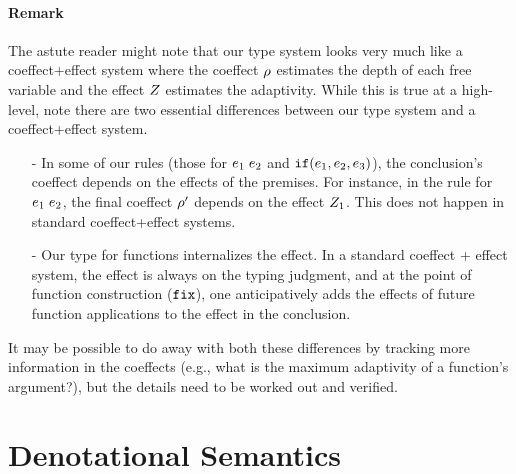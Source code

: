 \documentclass[a4paper,11pt]{article}
\theoremstyle{definition}
\begin{document}
\paragraph{Remark}
The astute reader might note that our type system looks very much like
a coeffect+effect system where the coeffect $\rho$ estimates the
depth of each free variable and the effect $Z$ estimates the
adaptivity. While this is true at a high-level, note there are two
essential differences between our type system and a coeffect+effect
system.
\begin{itemize}
\item[-] In some of our rules (those for $e_1 \; e_2$ and
  $\mathtt{if}(e_1, e_2, e_3)$), the conclusion's coeffect
  depends on the effects of the premises. For instance, in the rule
  for $e_1 \; e_2$, the final coeffect $\rho'$ depends on
  the effect $Z_1$. This does not happen in standard
  coeffect+effect systems.
\item[-] Our type for functions internalizes the effect. In a standard
  coeffect + effect system, the effect is always on the typing
  judgment, and at the point of function construction ($\mathop{\mathtt{fix}}$), one
  anticipatively adds the effects of future function applications to
  the effect in the conclusion.
\end{itemize}
It may be possible to do away with both these differences by tracking
more information in the coeffects (e.g., what is the maximum
adaptivity of a function's argument?), but the details need to be
worked out and verified.




\section{Denotational Semantics}
\end{document}
